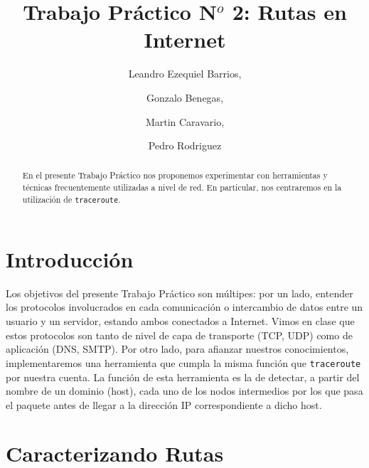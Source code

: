 \documentclass[final,inline,a4paper,narroweqnarray]{ieee}
\let\Oldsection\section
\renewcommand{\section}{\FloatBarrier\Oldsection}
\begin{document}
\title[TP N$^o$ 2: Rutas en Internet]{%
Trabajo Práctico N$^o$ 2: Rutas en Internet}

\author[Barrios, Benegas, Caravario, Rodriguez]{%
	Leandro Ezequiel Barrios,
	\and
	Gonzalo Benegas,
	\and
	Martin Caravario,
	\and
	Pedro Rodriguez
}

\maketitle

\begin{abstract}

En el presente Trabajo Práctico nos proponemos experimentar con herramientas 
y técnicas frecuentemente utilizadas a nivel de red. En particular, nos centraremos en la utilización de \texttt{traceroute}. 

\end{abstract}


\section{ Introducción }

Los objetivos del presente Trabajo Práctico son múltipes: por un lado, entender los protocolos involucrados en cada comunicación o intercambio de datos entre un usuario y un servidor, estando ambos conectados a Internet. Vimos en clase que estos protocolos son tanto de nivel de capa de transporte (TCP, UDP) como de aplicación (DNS, SMTP). Por otro lado, para afianzar nuestros conocimientos, implementaremos una herramienta que cumpla la misma función que \texttt{traceroute} por nuestra cuenta. La función de esta herramienta es la de detectar, a partir del nombre de un dominio (host), cada uno de los nodos intermedios por los que pasa el paquete antes de llegar a la dirección IP correspondiente a dicho host. 


\section{ Caracterizando Rutas}
\end{document}

